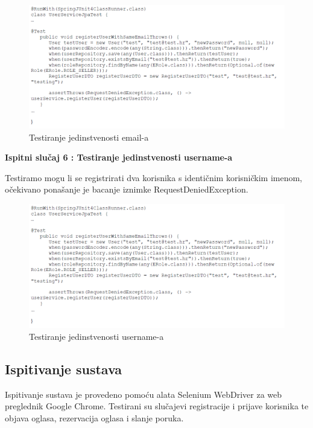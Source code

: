 	\begin{figure}[H]
		\includegraphics[scale=0.7]{slike/test5.PNG} %
		\centering
		\caption{Testiranje jedinstvenosti email-a}
		\label{fig:test5}
	\end{figure}
			
			
				\textbf{Ispitni slučaj 6 : Testiranje jedinstvenosti username-a}
			
		Testiramo mogu li se registrirati dva korisnika s identičnim korisničkim imenom, očekivano ponašanje je bacanje iznimke RequestDeniedException. 
			
			\begin{figure}[H]
				\includegraphics[scale=0.7]{slike/test5.PNG} %
				\centering
				\caption{Testiranje jedinstvenosti username-a}
				\label{fig:test6}
			\end{figure} 
		
			\subsection{Ispitivanje sustava}
			
			Ispitivanje sustava je provedeno pomoću alata Selenium WebDriver za web preglednik Google Chrome. Testirani su slučajevi registracije i prijave korisnika te objava oglasa, rezervacija oglasa i slanje poruka.
			
